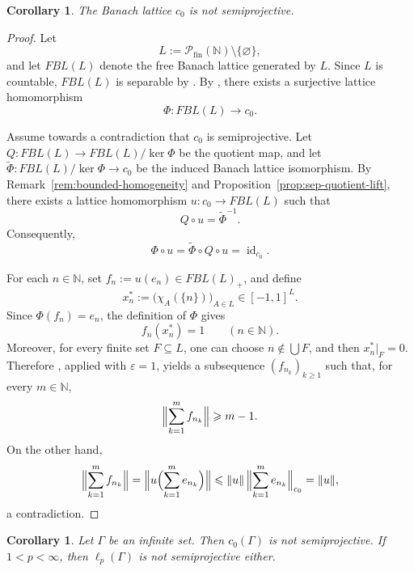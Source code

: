 \documentclass[11pt]{amsart}
\renewcommand{\le}{\leqslant}
\renewcommand{\ge}{\geqslant}
\numberwithin{equation}{section}
\newtheorem{corollary}[theorem]{Corollary}
\theoremstyle{definition}
\theoremstyle{remark}
\theoremstyle{plain}
\DeclareMathOperator{\id}{id}
\begin{document}
\begin{corollary}\label{cor:c0-not-semi}
The Banach lattice \(c_0\) is not semiprojective.
\end{corollary}

\begin{proof}
Let
\[
L:=\mathcal P_{\mathrm{fin}}(\mathbb N)\setminus\{\varnothing\},
\]
and let \(FBL(L)\) denote the free Banach lattice generated by \(L\).
Since \(L\) is countable, \(FBL(L)\) is separable by \cite[Theorem~8.4]{dpw}.
By \cite[Lemma~2.2]{avilaes-c0}, there exists a surjective lattice homomorphism
\[
\Phi\colon FBL(L)\to c_0.
\]

Assume towards a contradiction that \(c_0\) is semiprojective.
Let \(Q\colon FBL(L)\to FBL(L)/\ker\Phi\) be the quotient map, and let
\(\widetilde\Phi\colon FBL(L)/\ker\Phi\to c_0\)
be the induced Banach lattice isomorphism.
By Remark~\ref{rem:bounded-homogeneity} and
Proposition~\ref{prop:sep-quotient-lift}, there exists a lattice homomorphism
\(u\colon c_0\to FBL(L)\) such that
\[
Q\circ u=\widetilde\Phi^{-1}.
\]
Consequently,
\[
\Phi\circ u
=\widetilde\Phi\circ Q\circ u
=\id_{c_0}.
\]

For each \(n\in\mathbb N\), set \(f_n:=u(e_n)\in FBL(L)_+\), and define
\[
x_n^*:=\bigl(\chi_A(\{n\})\bigr)_{A\in L}\in[-1,1]^L.
\]
Since \(\Phi(f_n)=e_n\), the definition of \(\Phi\) gives
\[
f_n(x_n^*)=1
\qquad (n\in\mathbb N).
\]
Moreover, for every finite set \(F\subseteq L\), one can choose
\(n\notin \bigcup F\), and then \(x_n^*|_F=0\).
Therefore \cite[Lemma~2.3]{avilaes-c0}, applied with \(\varepsilon=1\),
yields a subsequence \((f_{n_k})_{k\ge 1}\) such that, for every \(m\in\mathbb N\),
\[
\Bigl\|\sum_{k=1}^m f_{n_k}\Bigr\|\ge m-1.
\]
On the other hand,
\[
\Bigl\|\sum_{k=1}^m f_{n_k}\Bigr\|
=\Bigl\|u\Bigl(\sum_{k=1}^m e_{n_k}\Bigr)\Bigr\|
\le \|u\|\,\Bigl\|\sum_{k=1}^m e_{n_k}\Bigr\|_{c_0}
=\|u\|,
\]
a contradiction.
\end{proof}

\begin{corollary}\label{cor:sequence-lattices-not-semi}
Let \(\Gamma\) be an infinite set.
Then \(c_0(\Gamma)\) is not semiprojective.
If \(1<p<\infty\), then \(\ell_p(\Gamma)\) is not semiprojective either.
\end{corollary}
\end{document}
